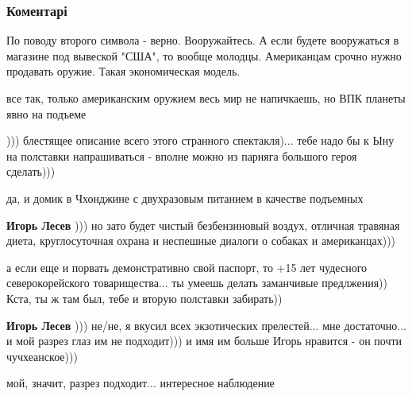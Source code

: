  
 
 
 
 
\subsubsection{Коментарі}
\label{sec:13_06_2018.fb.lesev_igor.1.singapur_vstrecha.cmt}

\begin{itemize} %
По поводу второго символа - верно. Вооружайтесь. А если будете вооружаться в магазине под вывеской "США", то вообще молодцы.
Американцам срочно нужно продавать оружие. Такая экономическая модель.

все так, только американским оружием весь мир не напичкаешь, но ВПК планеты явно на подъеме


))) блестящее описание всего этого странного спектакля)... тебе надо бы к Ыну на полставки напрашиваться - вполне можно из парняга большого героя сделать)))

\begin{itemize} %
да, и домик в Чхонджине с двухразовым питанием в качестве подъемных


\textbf{Игорь Лесев} ))) но зато будет чистый безбензиновый воздух, отличная травяная диета, круглосуточная охрана и неспешные диалоги о собаках и американцах)))


а если еще и порвать демонстративно свой паспорт, то +15 лет чудесного
северокорейского товарищества... ты умеешь делать заманчивые предлжения)) Кста,
ты ж там был, тебе и вторую полставки забирать))


\textbf{Игорь Лесев} ))) не/не, я вкусил всех экзотических прелестей... мне достаточно... и мой разрез глаз им не подходит))) и имя им больше Игорь нравится - он почти чучхеанское)))

мой, значит, разрез подходит... интересное наблюдение



\end{itemize}
\end{itemize}
